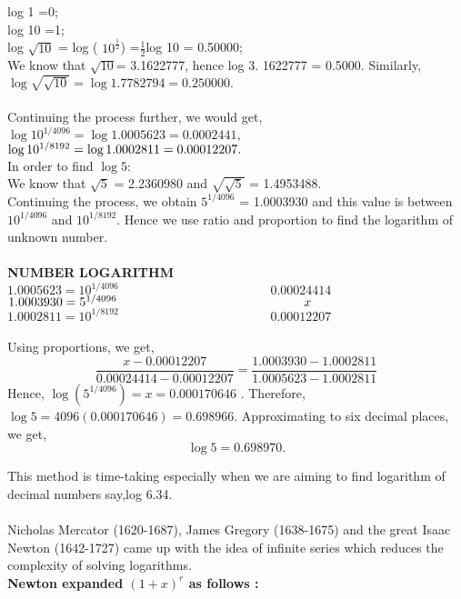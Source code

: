 \documentclass[a4paper,11pt]{article}
\begin{document}
\noindent log 1 =0;\\
log 10 =1;\\
log $\sqrt{10}$ = log ( $10^\frac{1}{2}$) =$\frac{1}{2}$log 10 = 0.50000;\\
We know that $\sqrt{10}$= 3.1622777, hence log 3. 1622777 = 0.5000. Similarly,\\
$\log \sqrt{\sqrt{10}}= \log 1.7782794= 0.250000.$\\
\\
Continuing the process further, we would get,\\
$\log 10^{1/4096} = \log 1.0005623 = 0.0002441,$\\
$\log 10^{1/8192} = \log 1.0002811 = 0.00012207.\\$
\\
In order to find $\log 5 $:\\
We know that $ \sqrt{5}$ = 2.2360980 and $\sqrt{\sqrt{5}}$ = 1.4953488.\\
Continuing the process, we obtain $5^{1/4096}$ = 1.0003930 and this value is between $10^{1/4096}$ and $10^{1/8192}.$ Hence we use ratio and proportion to find the logarithm of unknown number.\\
\\
\textbf{NUMBER} \hspace{6.1cm} \textbf{LOGARITHM}\\
$1.0005623 = 10^{1/4096}\hspace{5cm} 0.00024414 $\\
$1.0003930 =  5^{1/4096} \hspace{5.2cm}  x$\\
$1.0002811 = 10^{1/8192}\hspace{5cm} 0.00012207 $\\
\\
Using proportions, we get,\\
$$\frac{x - 0.00012207}{0.00024414 -0.00012207} = \frac{1.0003930-1.0002811} {1.0005623 -1.0002811} $$
 Hence,  $\log(5^{1/4096})
 = x = 0.000170646$ . Therefore, 
$\log 5 = 4096 (0.000170646) = 0.698966 . $ Approximating to six decimal places, we get,\\
$$ \log 5 = 0.698970. $$

\noindent This method is time-taking especially when we are aiming to find logarithm of decimal numbers say,log 6.34. \\
\\
Nicholas Mercator (1620-1687), James Gregory (1638-1675) and the great Isaac Newton (1642-1727) came up with the idea of infinite series which reduces the complexity of solving logarithms.\\
\textbf{Newton expanded $(1 + x)^r$ as follows :}\\
\end{document}
